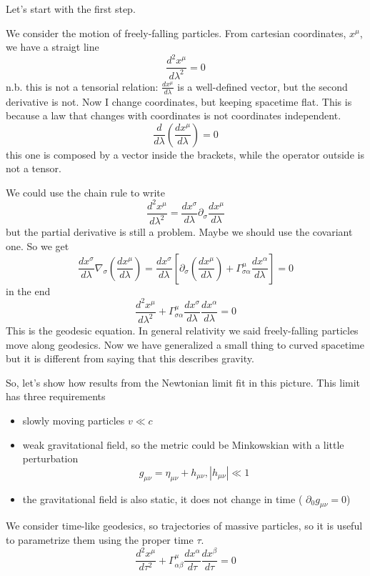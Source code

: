 Let's start with the first step. \par
We consider the motion of freely-falling particles. From cartesian coordinates, $x^{\mu }$, we have a straigt line \[
\frac{d ^{2}x^{\mu }}{d \lambda ^{2}} = 0 
\]
n.b. this is not a tensorial relation: $\frac{d x^{\mu }}{d \lambda }$ is a well-defined vector, but the second derivative is not.
Now I change coordinates, but keeping spacetime flat. This is because a law that changes with coordinates is not coordinates independent.
\[
\frac{d }{d \lambda }\left( \frac{d x^{\mu }}{d \lambda } \right) = 0
\]
this one is composed by a vector inside the brackets, while the operator outside is not a tensor. \par
We could use the chain rule to write
\[
\frac{d ^{2}x^{\mu }}{d \lambda ^{2}} = \frac{d x^{\sigma }}{d \lambda }\partial_{\sigma }\frac{d x^{\mu }}{d \lambda }
\]
but the partial derivative is still a problem. Maybe we should use the covariant one.
So we get
\[
	\frac{d x^{\sigma }}{d \lambda }\nabla _{\sigma } \left( \frac{d x^{\mu }}{d \lambda } \right) = \frac{d x^{\sigma }}{d \lambda }\left[ \partial_{\sigma } \left( \frac{d x^{\mu }}{d \lambda } \right) + \Gamma ^{\mu }_{\sigma \alpha } \frac{d x^{\alpha }}{d \lambda }\right] = 0
\]
in the end
\[
\frac{d ^{2}x^{\mu }}{d \lambda ^{2}} + \Gamma ^{\mu }_{\sigma \alpha }\frac{d x^{\sigma }}{d \lambda }\frac{d x^{\alpha }}{d \lambda } = 0
\]
This is the geodesic equation. In general relativity we said freely-falling particles move along geodesics. Now we have generalized a small thing to curved spacetime but it is different from saying that this describes gravity.\par
So, let's show how results from the Newtonian limit fit in this picture. This limit has three requirements
\begin{itemize}
\item slowly moving particles $v \ll c$
\item weak gravitational field, so the metric could be Minkowskian with a little perturbation
	\[
		g_{\mu \nu } = \eta _{\mu \nu } + h_{\mu \nu }, |h_{\mu \nu }|\ll 1
	\]
\item the gravitational field is also static, it does not change in time ( $\partial_{0}g_{\mu \nu } = 0$)
\end{itemize}
We consider time-like geodesics, so trajectories of massive particles, so it is useful to parametrize them using the proper time $\tau $.
\[
\frac{d ^{2}x^{\mu }}{d \tau ^{2}} + \Gamma ^{\mu }_{\alpha  \beta } \frac{d x^{\alpha }}{d \tau }\frac{d x^{\beta }}{d \tau } = 0
\]
